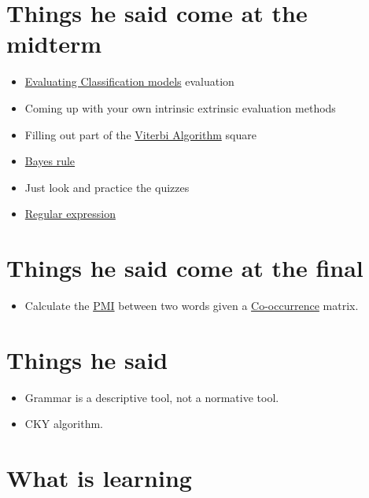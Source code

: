 \documentclass[
  11pt,
  british,
]{article}
\providecommand{\tightlist}{%
  \setlength{\itemsep}{0pt}\setlength{\parskip}{0pt}}
\begin{document}
\hypertarget{things-he-said-come-at-the-midterm}{%
\section{Things he said come at the
midterm}\label{things-he-said-come-at-the-midterm}}

\begin{itemize}
\tightlist
\item
  \href{../Classification/Evaluating\%20Classification\%20models.md}{Evaluating
  Classification models} evaluation
\item
  Coming up with your own intrinsic extrinsic evaluation methods
\item
  Filling out part of the
  \href{../Prediction/Viterbi\%20Algorithm.md}{Viterbi Algorithm} square
\item
  \href{../Classification/Native\%20baiyes/Bayes\%20rule.md}{Bayes rule}
\item
  Just look and practice the quizzes
\item
  \href{../Languages/Regular\%20expression.md}{Regular expression}
\end{itemize}

\hypertarget{things-he-said-come-at-the-final}{%
\section{Things he said come at the
final}\label{things-he-said-come-at-the-final}}

\begin{itemize}
\tightlist
\item
  Calculate the \href{../Semantic-Similarity/Co-occurrence.md}{PMI}
  between two words given a
  \href{../Semantic-Similarity/Co-occurrence.md}{Co-occurrence} matrix.
\end{itemize}

\hypertarget{things-he-said}{%
\section{Things he said}\label{things-he-said}}

\begin{itemize}
\tightlist
\item
  Grammar is a descriptive tool, not a normative tool.
\item
  CKY algorithm.
\end{itemize}

\hypertarget{what-is-learning}{%
\section{What is learning}\label{what-is-learning}}
\end{document}
